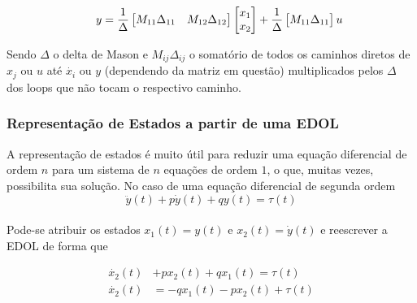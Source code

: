 \documentclass{article}
\numberwithin{equation}{section}
\begin{document}
    \begin{equation*}
        \hspace{0.5cm} y = \frac{1}{\Delta}
        \begin{bmatrix}
            M_{11}\Delta_{11} & M_{12}\Delta_{12}\\
        \end{bmatrix}
        \begin{bmatrix}
            x_{1} \\
            x_{2}
        \end{bmatrix}
        + \frac{1}{\Delta}
        \begin{bmatrix}
            M_{11}\Delta_{11}
        \end{bmatrix}
        u
    \end{equation*}

    Sendo $\Delta$ o delta de Mason e $M_{ij}\Delta_{ij}$ o somatório de todos os caminhos diretos de $x_{j}$ ou $u$ até $\dot{x_{i}}$ ou $y$ (dependendo da matriz em questão) multiplicados pelos $\Delta$ dos loops que não tocam o respectivo caminho.

    \subsubsection{Representação de Estados a partir de uma EDOL}
    \label{subsubsec:est_edol}
    A representação de estados é muito útil para reduzir uma equação diferencial de ordem $n$ para um sistema de $n$ equações de ordem $1$, o que, muitas vezes, possibilita sua solução. No caso de uma equação diferencial de segunda ordem
    \begin{equation*}
        \ddot{y}(t)+p\dot{y}(t)+qy(t)=\tau(t)
    \end{equation*} \\
    Pode-se atribuir os estados $x_{1}(t)=y(t)$ e $x_{2}(t)=\dot{y}(t)$ e reescrever a EDOL de forma que

    \begin{equation*}
        \begin{split}
            \dot{x_2}(t)&+px_{2}(t)+qx_{1}(t)=\tau(t) \\
            \dot{x_2}(t)&=-qx_{1}(t)-px_{2}(t)+\tau(t)
        \end{split}
    \end{equation*}
\end{document}
